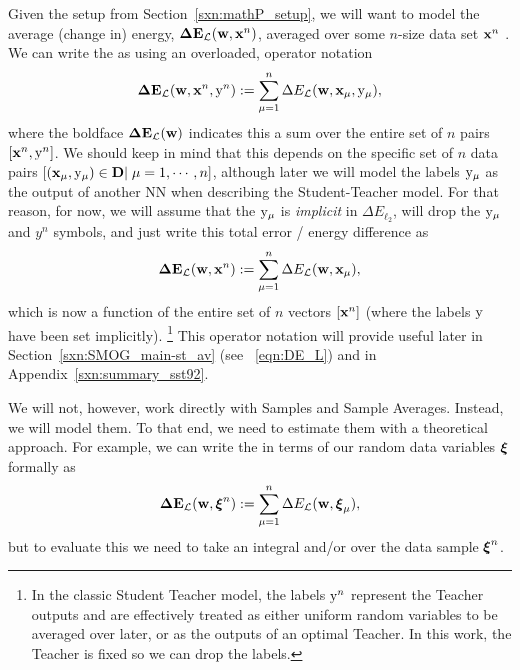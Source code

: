 Given the setup from Section~\ref{sxn:mathP_setup},
we will want to model the average (change in) energy,  $\mathbf{\Delta {E}}_{\mathcal{L}}(\mathbf{w}, \mathbf{x}^{n})$, averaged over some $n$-size data set $\mathbf{x}^{n}$ .
We can write the \TotalDataSampleError as
using an overloaded, operator notation 
\begin{align}
  \label{eqn:detopxy}
  \mathbf{\Delta {E}}_{\mathcal{L}}(\mathbf{w}, \mathbf{x}^{n}, \mathrm{y}^{n}) :=\sum_{\mu=1}^{n}\Delta E_{\mathcal{L}}({\mathbf{w}},{\mathbf{x}}_{\mu}, \mathrm{y}_{\mu})  ,
\end{align}
where the boldface $\mathbf{\Delta {E}}_{\mathcal{L}}(\mathbf{w})$ indicates this a sum over the entire set of  $n$ pairs $[\mathbf{x}^{n}, \mathrm{y}^{n}]$.
We should keep in mind that this depends on the specific set of $n$ data pairs
$[({\mathbf{x}}_{\mu},\mathrm{y}_{\mu})\in\mathbf{D}|\;\mu=1,\cdots,n]$, 
although later we will model the labels $\mathrm{y}_{\mu}$ as the output of another NN
when describing the Student-Teacher model.
%
For that reason, for now, we
will assume that the $\mathrm{y}_{\mu}$ is \emph{implicit} in $\Delta E_{\ell_2}$,
will drop the $\mathrm{y}_{\mu}$ and $y^{n}$ symbols,   
and just write this total error / energy difference as
\begin{align}
  \label{eqn:detox_FIXLATER}
  \mathbf{\Delta {E}}_{\mathcal{L}}(\mathbf{w}, \mathbf{x}^{n}) :=\sum_{\mu=1}^{n}\Delta E_{\mathcal{L}}({\mathbf{w}},{\mathbf{x}}_{\mu})  ,
\end{align}
which is now a function of the entire set of  $n$ vectors $[\mathbf{x}^{n}]$
(where the labels $\mathrm{y}$ have been set implicitly).
\footnote{In the classic Student Teacher model, the labels  $\mathrm{y}^{n}$ represent the Teacher outputs and are effectively treated as either uniform random variables to be averaged over later, or as the outputs of an optimal Teacher. In this work, the Teacher is fixed so we can drop the labels.}
This operator notation will provide useful later in Section~\ref{sxn:SMOG_main-st_av}
(see \EQN~\ref{eqn:DE_L}) and in Appendix~\ref{sxn:summary_sst92}.

We will not, however, work directly with Samples and Sample Averages.
Instead, we will model them.
To that end, we need to estimate them with a theoretical approach.
For example, we can write the \TotalDataSampleError in terms of our random data variables $\boldsymbol{\xi}$ formally as
\begin{align}
\label{eqn:tdse}
\mathbf{\Delta {E}}_{\mathcal{L}}(\mathbf{w}, \boldsymbol{\xi}^{n}) := \sum_{\mu=1}^{n}\Delta E_{\mathcal{L}}(\mathbf{w},\boldsymbol{\xi}_{\mu}) ,
\end{align}
but to evaluate this we need to take an integral and/or \ExpectedValue over the data sample $\boldsymbol{\xi}^{n}$.

